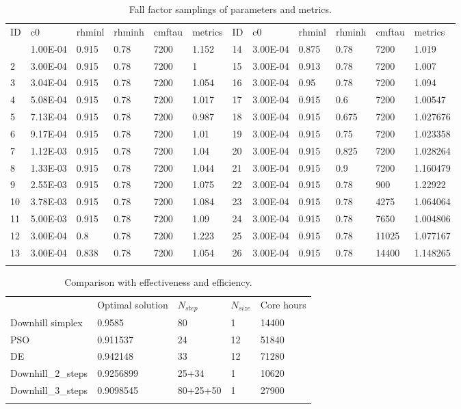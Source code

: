 \documentclass[gmd, manuscript]{copernicus}
\begin{document}
\begin{table}[t]
\caption{Fall factor samplings of parameters and metrics.}
\begin{tabular}{l l l l l l l l l l l l}
\tophline
ID & c0 & rhminl & rhminh & cmftau & metrics & ID & c0 & rhminl & rhminh & cmftau & metrics \\
\middlehline
1  & 1.00E-04 & 0.915 & 0.78 & 7200 & 1.152 & 14 & 3.00E-04  & 0.875 & 0.78  & 7200  & 1.019     \\
2  & 3.00E-04 & 0.915 & 0.78 & 7200 & 1     & 15 & 3.00E-04  & 0.913 & 0.78  & 7200  & 1.007     \\
3  & 3.04E-04 & 0.915 & 0.78 & 7200 & 1.054 & 16 & 3.00E-04  & 0.95  & 0.78  & 7200  & 1.094     \\
4  & 5.08E-04 & 0.915 & 0.78 & 7200 & 1.017 & 17 & 3.00E-04  & 0.915 & 0.6   & 7200  & 1.00547   \\
5  & 7.13E-04 & 0.915 & 0.78 & 7200 & 0.987 & 18 & 3.00E-04  & 0.915 & 0.675 & 7200  & 1.027676  \\
6  & 9.17E-04 & 0.915 & 0.78 & 7200 & 1.01  & 19 & 3.00E-04  & 0.915 & 0.75  & 7200  & 1.023358  \\
7  & 1.12E-03 & 0.915 & 0.78 & 7200 & 1.04  & 20 & 3.00E-04  & 0.915 & 0.825 & 7200  & 1.028264  \\
8  & 1.33E-03 & 0.915 & 0.78 & 7200 & 1.044 & 21 & 3.00E-04  & 0.915 & 0.9   & 7200  & 1.160479  \\
9  & 2.55E-03 & 0.915 & 0.78 & 7200 & 1.075 & 22 & 3.00E-04  & 0.915 & 0.78  & 900   & 1.22922   \\
10 & 3.78E-03 & 0.915 & 0.78 & 7200 & 1.084 & 23 & 3.00E-04  & 0.915 & 0.78  & 4275  & 1.064064  \\
11 & 5.00E-03 & 0.915 & 0.78 & 7200 & 1.09  & 24 & 3.00E-04  & 0.915 & 0.78  & 7650  & 1.004806  \\
12 & 3.00E-04 & 0.8   & 0.78 & 7200 & 1.223 & 25 & 3.00E-04  & 0.915 & 0.78  & 11025 & 1.077167  \\
13 & 3.00E-04 & 0.838 & 0.78 & 7200 & 1.054 & 26 & 3.00E-04  & 0.915 & 0.78  & 14400 & 1.148265  \\
\bottomhline
\end{tabular}
\belowtable{} %
\end{table}

\begin{table}[t]
\caption{Comparison with effectiveness and efficiency.}
\begin{tabular}{l l l l l}
\tophline
  & Optimal solution & $N_{step}$ & $N_{size}$ & Core hours \\
\middlehline
Downhill simplex & 0.9585    & 80         & 1  & 14400 \\
PSO               & 0.911537  & 24         & 12 & 51840 \\
DE                & 0.942148  & 33         & 12 & 71280 \\
Downhill\_2\_steps  & 0.9256899 & 25+34    &  1 & 10620 \\
Downhill\_3\_steps  & 0.9098545 & 80+25+50 &  1 & 27900 \\
\bottomhline
\end{tabular}
\belowtable{} %
\end{table}
\end{document}
